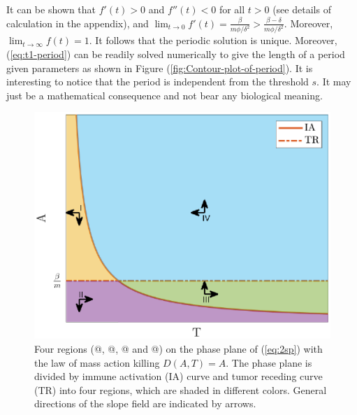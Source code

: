 \documentclass[review,authoryear]{elsarticle}
\makeatletter
\newcommand*{\rom}[1]{\expandafter\@slowromancap\romannumeral #1@}
\makeatother
\begin{document}
It can be shown that $f'(t)>0$ and $f''(t)<0$ for all $t>0$ (see
details of calculation in the appendix), and $\lim_{t\to0}f'(t)=\frac{\beta}{m\phi/\delta^{2}}>\frac{\beta-\delta}{m\phi/\delta^{2}}$.
Moreover, $\lim_{t\to\infty}f(t)=1$. It follows that the periodic
solution is unique. Moreover, (\ref{eq:t1-period}) can be readily
solved numerically to give the length of a period given parameters
as shown in Figure (\ref{fig:Contour-plot-of-period}). It is interesting
to notice that the period is independent from the threshold $s$.
It may just be a mathematical consequence and not bear any biological
meaning. 




\begin{figure}
\centerline{\includegraphics[width=1\linewidth]{figs/DA-colored-regions}}

\caption{Four regions (\rom{1}, \rom{2}, \rom{3} and \rom{4}) on the phase plane of (\ref{eq:2sp}) with the law of mass action killing $D(A,T)=A$. The phase plane is divided by immune activation (IA) curve and tumor receding curve (TR) into four regions, which are 
shaded in different colors. General directions of the slope field
are indicated by arrows.  \label{fig:DA-PP-4regions}}
\end{figure}
\end{document}
